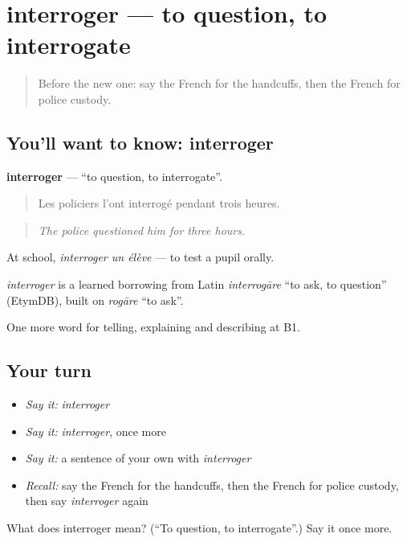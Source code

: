 \section[interroger]{interroger — to question, to interrogate}

\label{lesson:FR-C294-interroger}



\begin{quote}
Before the new one: say the French for the handcuffs, then the French for police custody.
\end{quote}

\subsection*{You'll want to know: interroger}
\textbf{interroger} — \textquotedblleft{}to question, to interrogate\textquotedblright{}.

\begin{quote}
Les policiers l'ont interrogé pendant trois heures.
\end{quote}

\begin{quote}
\emph{The police questioned him for three hours.}
\end{quote}

At school, \emph{interroger un élève} — to test a pupil orally.

\begin{cousinweb}
\emph{interroger} is a learned borrowing from Latin \emph{interrogāre} \textquotedblleft{}to ask, to question\textquotedblright{} (EtymDB), built on \emph{rogāre} \textquotedblleft{}to ask\textquotedblright{}.
\end{cousinweb}

\begin{grammarlens}[title={What you've built}]
One more word for telling, explaining and describing at B1.
\end{grammarlens}

\subsection*{Your turn}
\begin{itemize}
\raggedright
  \item \emph{Say it:} \emph{interroger}
  \item \emph{Say it:} \emph{interroger}, once more
  \item \emph{Say it:} a sentence of your own with \emph{interroger}
  \item \emph{Recall:} say the French for the handcuffs, then the French for police custody, then say \emph{interroger} again
\end{itemize}

\begin{tcolorbox}[breakable,colback=teal!4,colframe=teal!35!black,title={Before you move on}]
What does interroger mean? (\textquotedblleft{}To question, to interrogate\textquotedblright{}.) Say it once more.
\end{tcolorbox}
